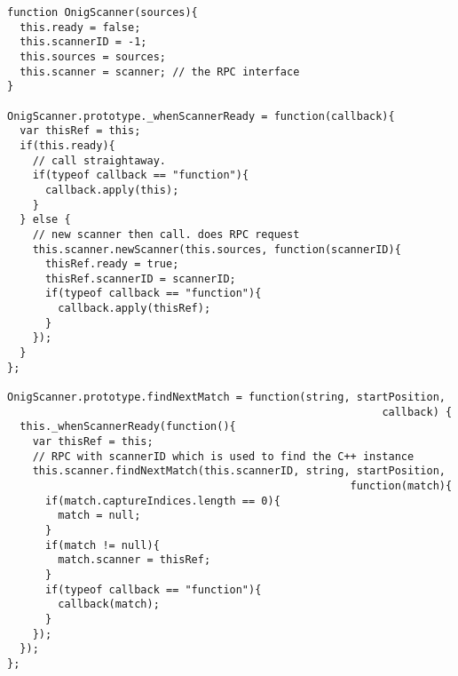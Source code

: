 \begin{lstlisting}
function OnigScanner(sources){
  this.ready = false;
  this.scannerID = -1;
  this.sources = sources;
  this.scanner = scanner; // the RPC interface
}

OnigScanner.prototype._whenScannerReady = function(callback){
  var thisRef = this;
  if(this.ready){
    // call straightaway.
    if(typeof callback == "function"){
      callback.apply(this);
    }
  } else {
    // new scanner then call. does RPC request
    this.scanner.newScanner(this.sources, function(scannerID){
      thisRef.ready = true;
      thisRef.scannerID = scannerID;
      if(typeof callback == "function"){
        callback.apply(thisRef);
      }
    });
  }
};

OnigScanner.prototype.findNextMatch = function(string, startPosition, 
                                                           callback) {
  this._whenScannerReady(function(){
    var thisRef = this;
    // RPC with scannerID which is used to find the C++ instance
    this.scanner.findNextMatch(this.scannerID, string, startPosition, 
                                                      function(match){
      if(match.captureIndices.length == 0){
        match = null;
      }
      if(match != null){
        match.scanner = thisRef;
      }
      if(typeof callback == "function"){
        callback(match);
      }
    });
  });
};
\end{lstlisting}


